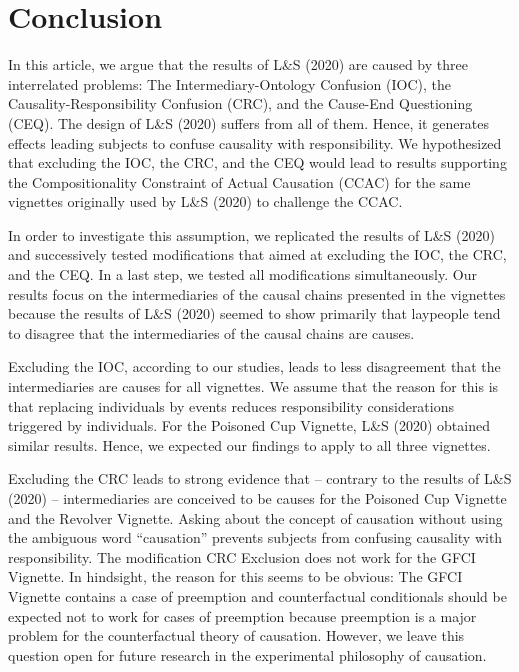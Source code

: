 \documentclass[egregdoesnotlikesansseriftitles,12pt]{scrartcl}
\begin{document}
\section{Conclusion}\label{sec:conclusion}
In this article, we argue that the results of L\&S (2020) are caused by three interrelated problems: The Intermediary-Ontology Confusion (IOC), the Causality-Responsibility Confusion (CRC), and the Cause-End Questioning (CEQ). The design of L\&S (2020) suffers from all of them. Hence, it generates effects leading subjects to confuse causality with responsibility. We hypothesized that excluding the IOC, the CRC, and the CEQ would lead to results supporting the Compositionality Constraint of Actual Causation (CCAC) for the same vignettes originally used by L\&S (2020) to challenge the CCAC.

In order to investigate this assumption, we replicated the results of L\&S (2020) and successively tested modifications that aimed at excluding the IOC, the CRC, and the CEQ. In a last step, we tested all modifications simultaneously. Our results focus on the intermediaries of the causal chains presented in the vignettes because the results of L\&S (2020) seemed to show primarily that laypeople tend to disagree that the intermediaries of the causal chains are causes.

Excluding the IOC, according to our studies, leads to less disagreement that the intermediaries are causes for all vignettes. We assume that the reason for this is that replacing individuals by events reduces responsibility considerations triggered by individuals. For the Poisoned Cup Vignette, L\&S (2020) obtained similar results. Hence, we expected our findings to apply to all three vignettes.

Excluding the CRC leads to strong evidence that -- contrary to the results of L\&S (2020) -- intermediaries are conceived to be causes for the Poisoned Cup Vignette and the Revolver Vignette. Asking about the concept of causation without using the ambiguous word ``causation'' prevents subjects from confusing causality with responsibility. The modification CRC Exclusion does not work for the GFCI Vignette. In hindsight, the reason for this seems to be obvious: The GFCI Vignette contains a case of preemption and counterfactual conditionals should be expected not to work for cases of preemption because preemption is a major problem for the counterfactual theory of causation. However, we leave this question open for future research in the experimental philosophy of causation.
\end{document}

